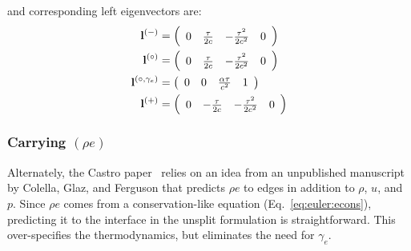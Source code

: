 and corresponding left eigenvectors are:
\begin{align}
\lb^\evm &= \left( \begin{array}{cccc} 0 & \frac{\tau}{2 c} & - \frac{\tau^{2}}{2 c^{2}} & 0\end{array}\right) \\
%
\lb^\evz &= \left( \begin{array}{cccc} 0 & \frac{\tau}{2 c} & - \frac{\tau^{2}}{2 c^{2}} & 0\end{array}\right) \\
%
\lb^\evzs{\gamma_e} &= \left( \begin{array}{cccc} 0 & 0 & \frac{\alpha \tau}{c^{2}} & 1\end{array}\right) \\
%
\lb^\evp &= \left ( \begin{array}{cccc} 0 & - \frac{\tau}{2 c} & - \frac{\tau^{2}}{2 c^{2}} & 0\end{array}\right)
\end{align}

\subsubsection{Carrying $(\rho e)$}

Alternately, the Castro paper~\cite{almgren:2010} relies on an idea
from an unpublished manuscript by Colella, Glaz, and Ferguson that
predicts $\rho e$ to edges in addition to $\rho$, $u$, and $p$.  Since
$\rho e$ comes from a conservation-like equation
(Eq.~\ref{eq:euler:econs}), predicting it to the interface in the
unsplit formulation is straightforward.  This over-specifies the
thermodynamics, but eliminates the need for $\gamma_e$.


